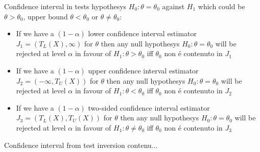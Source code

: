 \documentclass[asd-beamer.tex]{subfiles}%
\begin{document}
\begin{frame}{Confidence interval in tests hypothesys}
$H_0: \theta=\theta_0$ against $H_1$ which could be $\theta>\theta_0$, upper bound $\theta<\theta_0$ or $\theta\neq\theta_0$:
\begin{itemize}
    \item If we have a $(1-\alpha)$ lower confidence interval estimator $J_1=(T_L(X),\infty)$ for $\theta$ then any null hypothesys $H_0: \theta=\theta_0$ will be rejected at level $\alpha$ in favour of $H_1:\theta>\theta_0$ iff $\theta_0$ non \'e contenuto in $J_1$
\item If we have a $(1-\alpha)$ upper confidence interval estimator $J_2=(-\infty,T_U(X))$ for $\theta$ then any null hypothesys $H_0: \theta=\theta_0$ will be rejected at level $\alpha$ in favour of $H_1: \theta<\theta_0$ iff $\theta_0$ non \'e contenuto in $J_2$
\item If we have a $(1-\alpha)$ two-sided confidence interval estimator $J_3=(T_L(X),T_U(X))$ for $\theta$ then any null hypothesys $H_0: \theta=\theta_0$ will be rejected at level $\alpha$ in favour of $H_1: \theta\neq\theta_0$ iff $\theta_0$ non \'e contenuto in $J_3$
\end{itemize}
\end{frame}

\begin{frame}{Confidence interval from test inversion}
	contenu...
\end{frame}
\end{document}
